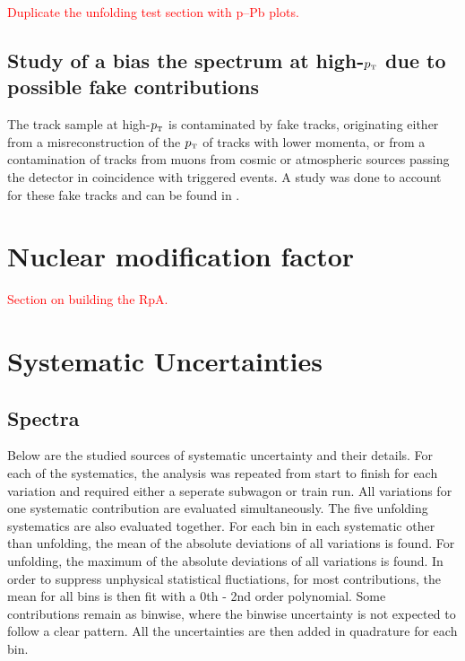 \documentclass[ALICE]{ALICE_analysis_notes}
\newcommand{\pT}{$p_{\mbox{\tiny T}}$\xspace}
\newcommand{\pPb}{{\mbox{p--Pb}}\xspace}
\begin{document}
\textcolor{red}{Duplicate the unfolding test section with \pPb plots.}

\subsection{Study of a bias the spectrum at high-\texorpdfstring{\pT}{pT} due to possible fake contributions}
\label{sec:biasStudy}

The track sample at high-\pT is contaminated by fake tracks, originating either from a misreconstruction of the \pT of tracks with lower momenta, or from a contamination of tracks from muons from cosmic or atmospheric sources passing the detector in coincidence with triggered events. A study was done to account for these fake tracks and can be found in \cite{anaNoteMFasel}.\clearpage{}
\clearpage{}\section{Nuclear modification factor}
\label{sec:nuclearModFac}

\textcolor{red}{Section on building the RpA.}\clearpage{}
\clearpage{}\section{Systematic Uncertainties}
\label{chap:Systematics}

\subsection{Spectra}
\label{sec:SystematicsSpectra}

Below are the studied sources of systematic uncertainty and their details. For each of the systematics, the analysis was repeated from start to finish for each variation and required either a seperate subwagon or train run. All variations for one systematic contribution are evaluated simultaneously. The five unfolding systematics are also evaluated together. For each bin in each systematic other than unfolding, the mean of the absolute deviations of all variations is found. For unfolding, the maximum of the absolute deviations of all variations is found. In order to suppress unphysical statistical fluctiations, for most contributions, the mean for all bins is then fit with a 0th - 2nd order polynomial. Some contributions remain as binwise, where the binwise uncertainty is not expected to follow a clear pattern. All the uncertainties are then added in quadrature for each bin.
\end{document}
